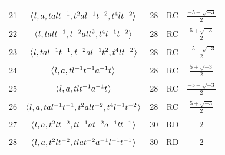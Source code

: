 \documentclass[11pt]{amsart}
\theoremstyle{definition}
\theoremstyle{remark}
\begin{document}
\begin{table}[h!]
\begin{center}
\begin{tabular}{|c|c|c|c|c|}
\vspace{-12pt} & & & &   \\
21& $\langle \hspace{.75pt} l, a, talt^{-1}, t^2al^{-1}t^{-2}, t^4lt^{-2}\rangle$ &28& RC&
$\frac{-5+\sqrt{-3}}{2}$ \\
\vspace{-12pt} & & & &   \\
22& $\langle \hspace{.75pt} l, talt^{-1}, t^{-2}alt^2, t^4l^{-1}t^{-2}\rangle$ &28& RC&
$\frac{5+\sqrt{-3}}{2}$ \\
\vspace{-12pt} & & & &   \\
23& $\langle \hspace{.75pt} l, tal^{-1}t^{-1}, t^{-2}al^{-1}t^2, 
t^4lt^{-2} \hspace{.75pt}\rangle$&28& RC&
$\frac{-5+\sqrt{-3}}{2}$ \\
\vspace{-12pt} & & & &   \\
24& $\langle \hspace{.75pt} l, a, tl^{-1}t^{-1}a^{-1}t \hspace{.75pt}\rangle$
&28& RC& $\frac{5+\sqrt{-3}}{2}$ \\
\vspace{-12pt} & & & &   \\
25& $\langle \hspace{.75pt} l, a, tlt^{-1}a^{-1}t \hspace{.75pt}\rangle$
&28& RC& $\frac{-5+\sqrt{-3}}{2}$ \\
\vspace{-12pt} & & & &   \\
26& $\langle \hspace{.75pt} l, a, tal^{-1}t^{-1}, 
t^2alt^{-2}, t^4l^{-1}t^{-2} \hspace{.75pt}\rangle$&28& RC&
$\frac{5+\sqrt{-3}}{2}$ \\
\vspace{-12pt} & & & &   \\
27& $\langle \hspace{.75pt} l, a, t^2lt^{-2}, 
tl^{-1}at^{-2}a^{-1}lt^{-1} \hspace{.75pt}\rangle$&30& RD& $2$ \\
\vspace{-12pt} & & & &   \\
28& $\langle \hspace{.75pt} l, a, t^2lt^{-2}, 
tlat^{-2}a^{-1}l^{-1}t^{-1} \hspace{.75pt}\rangle$&30& RD& $2$ \\

\end{tabular}
\end{center}
\end{table}
\end{document}
